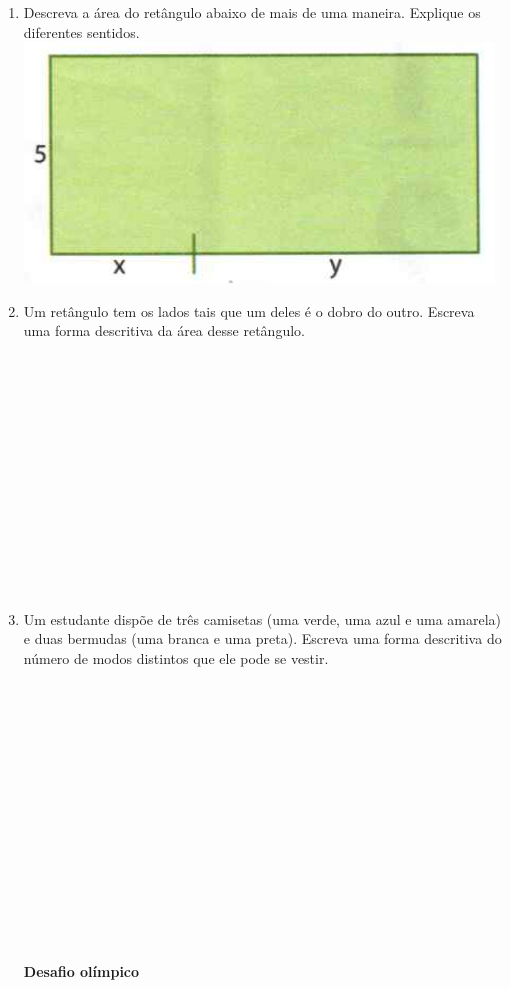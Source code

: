 \documentclass[a4paper,14pt]{article}
\begin{document}
\begin{multicols}{2}
\begin{enumerate}
			\item Descreva a área do retângulo abaixo de mais de uma maneira. Explique os diferentes sentidos.
			\includegraphics[width=1\linewidth]{6FMA06_imagens/imagem1}
			\newpage
			\item Um retângulo tem os lados tais que um deles é o dobro do outro. Escreva uma forma descritiva da área desse retângulo. \\\\\\\\\\\\\\\\\\\\\\\\\\\\
			\item Um estudante dispõe de três camisetas (uma verde, uma azul e uma amarela) e duas bermudas (uma branca e uma preta). Escreva uma forma descritiva do número de modos distintos que ele pode se vestir. \\\\\\\\\\\\\\\\\\\\\\\\\\\\\\\\
			\textbf{Desafio olímpico} \\

\end{enumerate}
\end{multicols}
\end{document}
